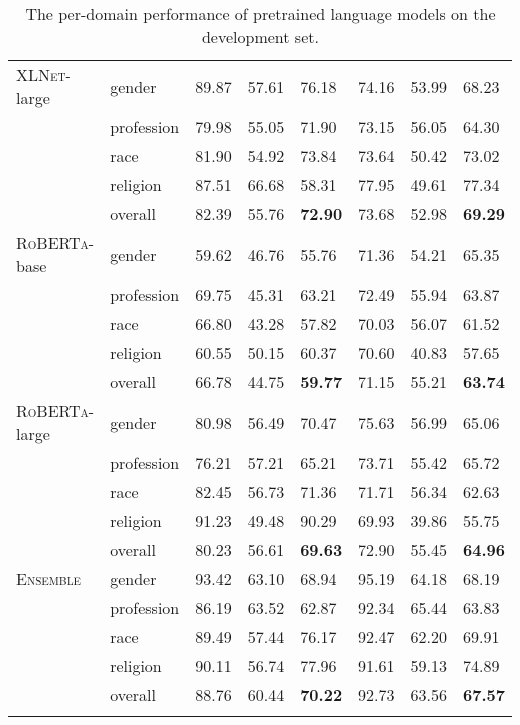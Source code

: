 \documentclass[11pt,a4paper]{article}
\newcommand \roberta{\textsc{RoBERTa}\xspace}
\newcommand \xlnet{\textsc{XLNet}\xspace}
\newcommand \ensemble{\textsc{Ensemble}\xspace}
\begin{document}
\begin{table*}[]
\begin{adjustbox}{totalheight=\textheight}
\begin{tabular}{llp{5em}p{5em}p{5em}p{5em}p{5em}p{5em}}
\xlnet-large & gender & 89.87 & 57.61 & 76.18 & 74.16 & 53.99 & 68.23 \\
 & profession & 79.98 & 55.05 & 71.90 & 73.15 & 56.05 & 64.30 \\
 & race & 81.90 & 54.92 & 73.84 & 73.64 & 50.42 & 73.02 \\
 & religion & 87.51 & 66.68 & 58.31 & 77.95 & 49.61 & 77.34 \\
\textit{} & \cellcolor[HTML]{ECF4FF}overall & \cellcolor[HTML]{ECF4FF}82.39 & \cellcolor[HTML]{ECF4FF}55.76 & \cellcolor[HTML]{ECF4FF}\textbf{72.90} & \cellcolor[HTML]{ECF4FF}73.68 & \cellcolor[HTML]{ECF4FF}52.98 & \cellcolor[HTML]{ECF4FF}\textbf{69.29}\\
\roberta-base & gender & 59.62 & 46.76 & 55.76 & 71.36 & 54.21 & 65.35 \\
 & profession & 69.75 & 45.31 & 63.21 & 72.49 & 55.94 & 63.87 \\
 & race & 66.80 & 43.28 & 57.82 & 70.03 & 56.07 & 61.52 \\
 & religion & 60.55 & 50.15 & 60.37 & 70.60 & 40.83 & 57.65 \\
\textit{} & \cellcolor[HTML]{ECF4FF}overall & \cellcolor[HTML]{ECF4FF}66.78 & \cellcolor[HTML]{ECF4FF}44.75 & \cellcolor[HTML]{ECF4FF}\textbf{59.77} & \cellcolor[HTML]{ECF4FF}71.15 & \cellcolor[HTML]{ECF4FF}55.21 & \cellcolor[HTML]{ECF4FF}\textbf{63.74}\\
\roberta-large & gender & 80.98 & 56.49 & 70.47 & 75.63 & 56.99 & 65.06 \\
 & profession & 76.21 & 57.21 & 65.21 & 73.71 & 55.42 & 65.72 \\
 & race & 82.45 & 56.73 & 71.36 & 71.71 & 56.34 & 62.63 \\
 & religion & 91.23 & 49.48 & 90.29 & 69.93 & 39.86 & 55.75 \\
\textit{} & \cellcolor[HTML]{ECF4FF}overall & \cellcolor[HTML]{ECF4FF}80.23 & \cellcolor[HTML]{ECF4FF}56.61 & \cellcolor[HTML]{ECF4FF}\textbf{69.63} & \cellcolor[HTML]{ECF4FF}72.90 & \cellcolor[HTML]{ECF4FF}55.45 & \cellcolor[HTML]{ECF4FF}\textbf{64.96}\\
\ensemble & gender & 93.42 & 63.10 & 68.94 & 95.19 & 64.18 & 68.19 \\
 & profession & 86.19 & 63.52 & 62.87 & 92.34 & 65.44 & 63.83 \\
 & race & 89.49 & 57.44 & 76.17 & 92.47 & 62.20 & 69.91 \\
 & religion & 90.11 & 56.74 & 77.96 & 91.61 & 59.13 & 74.89 \\
\textit{} & \cellcolor[HTML]{ECF4FF}overall & \cellcolor[HTML]{ECF4FF}88.76 & \cellcolor[HTML]{ECF4FF}60.44 & \cellcolor[HTML]{ECF4FF}\textbf{70.22} & \cellcolor[HTML]{ECF4FF}92.73 & \cellcolor[HTML]{ECF4FF}63.56 & \cellcolor[HTML]{ECF4FF}\textbf{67.57}\\
\\ \bottomrule
\end{tabular}
\end{adjustbox}
\caption{The per-domain performance of pretrained language models on the development set.}
\label{tab:detailed-table}
\end{table*}
\end{document}
